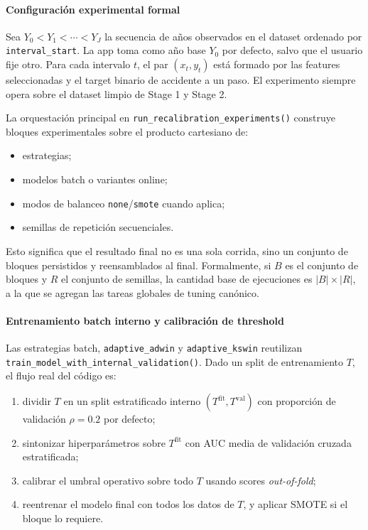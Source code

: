 \paragraph{Configuraci\'on experimental formal}
Sea \(Y_0 < Y_1 < \cdots < Y_J\) la secuencia de a\~nos observados en el dataset ordenado por \texttt{interval\_start}. La app toma como a\~no base \(Y_0\) por defecto, salvo que el usuario fije otro. Para cada intervalo \(t\), el par \((x_t, y_t)\) est\'a formado por las features seleccionadas y el target binario de accidente a un paso. El experimento siempre opera sobre el dataset limpio de Stage 1 y Stage 2.

La orquestaci\'on principal en \texttt{run\_recalibration\_experiments()} construye bloques experimentales sobre el producto cartesiano de:
\begin{itemize}[leftmargin=*]
  \item estrategias;
  \item modelos batch o variantes online;
  \item modos de balanceo \texttt{none}/\texttt{smote} cuando aplica;
  \item semillas de repetici\'on secuenciales.
\end{itemize}
Esto significa que el resultado final no es una sola corrida, sino un conjunto de bloques persistidos y reensamblados al final. Formalmente, si \(B\) es el conjunto de bloques y \(R\) el conjunto de semillas, la cantidad base de ejecuciones es \(|B|\times|R|\), a la que se agregan las tareas globales de tuning can\'onico.

\paragraph{Entrenamiento batch interno y calibraci\'on de threshold}
Las estrategias batch, \texttt{adaptive\_adwin} y \texttt{adaptive\_kswin} reutilizan \texttt{train\_model\_with\_internal\_validation()}. Dado un split de entrenamiento \(T\), el flujo real del c\'odigo es:
\begin{enumerate}[leftmargin=*]
  \item dividir \(T\) en un split estratificado interno \((T^{\mathrm{fit}}, T^{\mathrm{val}})\) con proporci\'on de validaci\'on \(\rho = 0.2\) por defecto;
  \item sintonizar hiperpar\'ametros sobre \(T^{\mathrm{fit}}\) con AUC media de validaci\'on cruzada estratificada;
  \item calibrar el umbral operativo sobre todo \(T\) usando scores \textit{out-of-fold};
  \item reentrenar el modelo final con todos los datos de \(T\), y aplicar SMOTE si el bloque lo requiere.
\end{enumerate}


